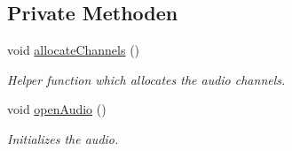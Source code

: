 \subsection*{Private Methoden}
\begin{DoxyCompactItemize}
\item 
void \hyperlink{class_drum_machine_a5a42497c3a1f390537b6c12fddab1619}{allocate\+Channels} ()
\begin{DoxyCompactList}\small\item\em Helper function which allocates the audio channels. \end{DoxyCompactList}\item 
void \hyperlink{class_drum_machine_afd65a07ff84b6c7854ddd9ee3a529382}{open\+Audio} ()
\begin{DoxyCompactList}\small\item\em Initializes the audio. \end{DoxyCompactList}\end{DoxyCompactItemize}
